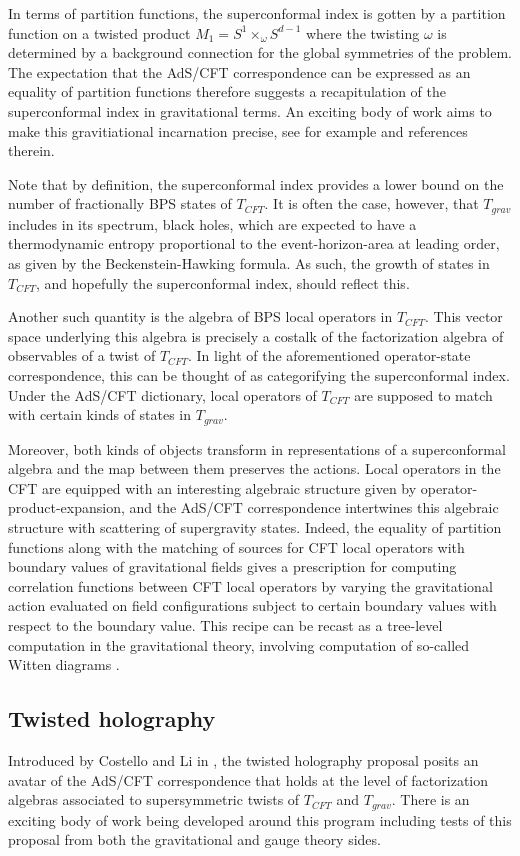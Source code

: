 In terms of partition functions, the superconformal index is gotten by a partition function on a twisted product $M_{1} = S^{1}\times_\omega S^{d-1}$ where the twisting $\omega$ is determined by a background connection for the global symmetries of the problem. The expectation that the AdS/CFT correspondence can be expressed as an equality of partition functions therefore suggests a recapitulation of the superconformal index in gravitational terms. An exciting body of work aims to make this gravitiational incarnation precise, see for example \cite{murthy2020growth} and references therein.  

Note that by definition, the superconformal index provides a lower bound on the number of fractionally BPS states of $T_{CFT}$. It is often the case, however, that $T_{grav}$ includes in its spectrum, black holes, which are expected to have a thermodynamic entropy proportional to the event-horizon-area at leading order, as given by the Beckenstein-Hawking formula. As such, the growth of states in $T_{CFT}$, and hopefully the superconformal index, should reflect this. 

\parsec[]
Another such quantity is the algebra of BPS local operators in $T_{CFT}$. This vector space underlying this algebra is precisely a costalk of the factorization algebra of observables of a twist of $T_{CFT}$. In light of the aforementioned operator-state correspondence, this can be thought of as categorifying the superconformal index. Under the AdS/CFT dictionary, local operators of $T_{CFT}$ are supposed to match with certain kinds of states in $T_{grav}$. 

Moreover, both kinds of objects transform in representations of a superconformal algebra and the map between them preserves the actions. Local operators in the CFT are equipped with an interesting algebraic structure given by operator-product-expansion, and the AdS/CFT correspondence intertwines this algebraic structure with scattering of supergravity states. Indeed, the equality of partition functions along with the matching of sources for CFT local operators with boundary values of gravitational fields gives a prescription for computing correlation functions between CFT local operators by varying the gravitational action evaluated on field configurations subject to certain boundary values with respect to the boundary value. This recipe can be recast as a tree-level computation in the gravitational theory, involving computation of so-called Witten diagrams \cite{Witten:AdS}.

\subsection{Twisted holography}
Introduced by Costello and Li in \cite{CLsugra}, the twisted holography proposal posits an avatar of the AdS/CFT correspondence that holds at the level of factorization algebras associated to supersymmetric twists of $T_{CFT}$ and $T_{grav}$. There is an exciting body of work being developed around this program including tests of this proposal from both the gravitational and gauge theory sides.

